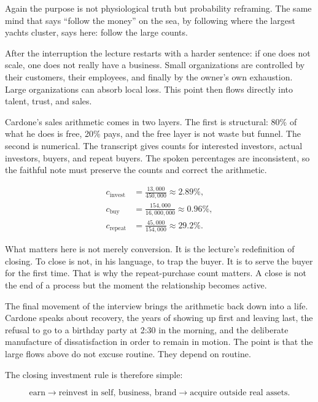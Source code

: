 Again the purpose is not physiological truth but probability reframing. The same mind that says ``follow the money'' on the sea, by following where the largest yachts cluster, says here: follow the large counts.

After the interruption the lecture restarts with a harder sentence: if one does not scale, one does not really have a business. Small organizations are controlled by their customers, their employees, and finally by the owner's own exhaustion. Large organizations can absorb local loss. This point then flows directly into talent, trust, and sales.

Cardone's sales arithmetic comes in two layers. The first is structural: 80\% of what he does is free, 20\% pays, and the free layer is not waste but funnel. The second is numerical. The transcript gives counts for interested investors, actual investors, buyers, and repeat buyers. The spoken percentages are inconsistent, so the faithful note must preserve the counts and correct the arithmetic.

\begin{align}
c_{\text{invest}} &= \frac{13{,}000}{450{,}000} \approx 2.89\%,\\
c_{\text{buy}} &= \frac{154{,}000}{16{,}000{,}000} \approx 0.96\%,\\
c_{\text{repeat}} &= \frac{45{,}000}{154{,}000} \approx 29.2\%.
\end{align}

What matters here is not merely conversion. It is the lecture's redefinition of closing. To close is not, in his language, to trap the buyer. It is to serve the buyer for the first time. That is why the repeat-purchase count matters. A close is not the end of a process but the moment the relationship becomes active.

The final movement of the interview brings the arithmetic back down into a life. Cardone speaks about recovery, the years of showing up first and leaving last, the refusal to go to a birthday party at 2:30 in the morning, and the deliberate manufacture of dissatisfaction in order to remain in motion. The point is that the large flows above do not excuse routine. They depend on routine.

The closing investment rule is therefore simple:

\begin{equation}
\text{earn} \to \text{reinvest in self, business, brand} \to \text{acquire outside real assets}.
\end{equation}

